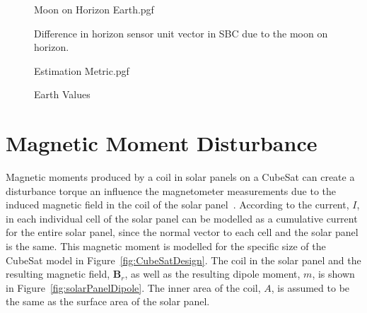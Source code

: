 \begin{figure*}[!htb]
	\centering

	{Moon on Horizon Earth.pgf}
	
	
	\caption{Difference in horizon sensor unit vector in SBC due to the moon on horizon.}
	\label{fig:Earth Vector comparison}
	
\end{figure*}

\begin{figure}[!htb]
	\centering
	
	{Estimation Metric.pgf}
	
	\caption{Earth Values}
	\label{fig:Moon On Horizon Estimation Metric}
\end{figure}


\section{Magnetic Moment Disturbance}
Magnetic moments produced by a coil in solar panels on a CubeSat can create a disturbance torque an influence the magnetometer measurements due to the induced magnetic field in the coil of the solar panel~\cite{ruckerl2019first, jeger2017determination}. According to \cite{jeger2017determination} the current, $I$, in each individual cell of the solar panel can be modelled as a cumulative current for the entire solar panel, since the normal vector to each cell and the solar panel is the same. This magnetic moment is modelled for the specific size of the CubeSat model in Figure~\ref{fig:CubeSatDesign}. The coil in the solar panel and the resulting magnetic field, $\mathbf{B}_r$, as well as the resulting dipole moment, $m$, is shown in Figure~\ref{fig:solarPanelDipole}. The inner area of the coil, $A$, is assumed to be the same as the surface area of the solar panel. 

